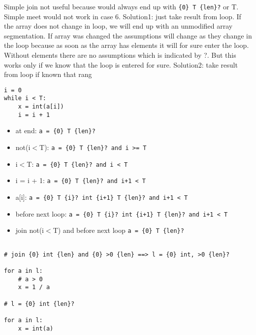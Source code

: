\documentclass[11pt]{article}
\begin{document}
Simple join not useful because would always end up with \verb|{0} T {len}?| or T.
Simple meet would not work in case 6.
Solution1: just take result from loop. If the array does not change in loop, we will end up with an unmodified array segmentation. If array was changed the assumptions will change as they change in the loop because as soon as the array has elements it will for sure enter the loop. Without elements there are no assumptions which is indicated by ?. But this works only if we know that the loop is entered for sure.
Solution2: take result from loop if known that rang


\begin{lstlisting}[numbers=none]
i = 0
while i < T:
    x = int(a[i])
    i = i + 1
\end{lstlisting}

\begin{itemize}
\item at end: \verb|a = {0} T {len}?|
\item not(i$<$T): \verb|a = {0} T {len}? and i >= T|
\item i$<$T: \verb|a = {0} T {len}? and i < T|
\item i = i + 1: \verb|a = {0} T {len}? and i+1 < T|
\item a[i]: \verb|a = {0} T {i}? int {i+1} T {len}? and i+1 < T|
\item before next loop: \verb|a = {0} T {i}? int {i+1} T {len}? and i+1 < T|
\item join not(i$<$T) and before next loop \verb|a = {0} T {len}?|
\end{itemize}



\begin{lstlisting}[numbers=none]

# join {0} int {len} and {0} >0 {len} ==> l = {0} int, >0 {len}?

for a in l:
    # a > 0
    x = 1 / a

# l = {0} int {len}?
    
for a in l:
    x = int(a)
\end{lstlisting}
\end{document}
